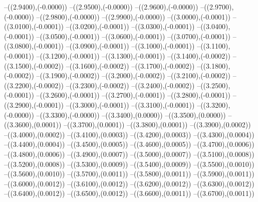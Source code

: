 {	--({\sx*(2.9400)},{\sy*(-0.0000)})
	--({\sx*(2.9500)},{\sy*(-0.0000)})
	--({\sx*(2.9600)},{\sy*(-0.0000)})
	--({\sx*(2.9700)},{\sy*(-0.0000)})
	--({\sx*(2.9800)},{\sy*(-0.0000)})
	--({\sx*(2.9900)},{\sy*(-0.0000)})
	--({\sx*(3.0000)},{\sy*(-0.0001)})
	--({\sx*(3.0100)},{\sy*(-0.0001)})
	--({\sx*(3.0200)},{\sy*(-0.0001)})
	--({\sx*(3.0300)},{\sy*(-0.0001)})
	--({\sx*(3.0400)},{\sy*(-0.0001)})
	--({\sx*(3.0500)},{\sy*(-0.0001)})
	--({\sx*(3.0600)},{\sy*(-0.0001)})
	--({\sx*(3.0700)},{\sy*(-0.0001)})
	--({\sx*(3.0800)},{\sy*(-0.0001)})
	--({\sx*(3.0900)},{\sy*(-0.0001)})
	--({\sx*(3.1000)},{\sy*(-0.0001)})
	--({\sx*(3.1100)},{\sy*(-0.0001)})
	--({\sx*(3.1200)},{\sy*(-0.0001)})
	--({\sx*(3.1300)},{\sy*(-0.0001)})
	--({\sx*(3.1400)},{\sy*(-0.0002)})
	--({\sx*(3.1500)},{\sy*(-0.0002)})
	--({\sx*(3.1600)},{\sy*(-0.0002)})
	--({\sx*(3.1700)},{\sy*(-0.0002)})
	--({\sx*(3.1800)},{\sy*(-0.0002)})
	--({\sx*(3.1900)},{\sy*(-0.0002)})
	--({\sx*(3.2000)},{\sy*(-0.0002)})
	--({\sx*(3.2100)},{\sy*(-0.0002)})
	--({\sx*(3.2200)},{\sy*(-0.0002)})
	--({\sx*(3.2300)},{\sy*(-0.0002)})
	--({\sx*(3.2400)},{\sy*(-0.0002)})
	--({\sx*(3.2500)},{\sy*(-0.0001)})
	--({\sx*(3.2600)},{\sy*(-0.0001)})
	--({\sx*(3.2700)},{\sy*(-0.0001)})
	--({\sx*(3.2800)},{\sy*(-0.0001)})
	--({\sx*(3.2900)},{\sy*(-0.0001)})
	--({\sx*(3.3000)},{\sy*(-0.0001)})
	--({\sx*(3.3100)},{\sy*(-0.0001)})
	--({\sx*(3.3200)},{\sy*(-0.0000)})
	--({\sx*(3.3300)},{\sy*(-0.0000)})
	--({\sx*(3.3400)},{\sy*(0.0000)})
	--({\sx*(3.3500)},{\sy*(0.0000)})
	--({\sx*(3.3600)},{\sy*(0.0001)})
	--({\sx*(3.3700)},{\sy*(0.0001)})
	--({\sx*(3.3800)},{\sy*(0.0001)})
	--({\sx*(3.3900)},{\sy*(0.0002)})
	--({\sx*(3.4000)},{\sy*(0.0002)})
	--({\sx*(3.4100)},{\sy*(0.0003)})
	--({\sx*(3.4200)},{\sy*(0.0003)})
	--({\sx*(3.4300)},{\sy*(0.0004)})
	--({\sx*(3.4400)},{\sy*(0.0004)})
	--({\sx*(3.4500)},{\sy*(0.0005)})
	--({\sx*(3.4600)},{\sy*(0.0005)})
	--({\sx*(3.4700)},{\sy*(0.0006)})
	--({\sx*(3.4800)},{\sy*(0.0006)})
	--({\sx*(3.4900)},{\sy*(0.0007)})
	--({\sx*(3.5000)},{\sy*(0.0007)})
	--({\sx*(3.5100)},{\sy*(0.0008)})
	--({\sx*(3.5200)},{\sy*(0.0008)})
	--({\sx*(3.5300)},{\sy*(0.0009)})
	--({\sx*(3.5400)},{\sy*(0.0009)})
	--({\sx*(3.5500)},{\sy*(0.0010)})
	--({\sx*(3.5600)},{\sy*(0.0010)})
	--({\sx*(3.5700)},{\sy*(0.0011)})
	--({\sx*(3.5800)},{\sy*(0.0011)})
	--({\sx*(3.5900)},{\sy*(0.0011)})
	--({\sx*(3.6000)},{\sy*(0.0012)})
	--({\sx*(3.6100)},{\sy*(0.0012)})
	--({\sx*(3.6200)},{\sy*(0.0012)})
	--({\sx*(3.6300)},{\sy*(0.0012)})
	--({\sx*(3.6400)},{\sy*(0.0012)})
	--({\sx*(3.6500)},{\sy*(0.0012)})
	--({\sx*(3.6600)},{\sy*(0.0011)})
	--({\sx*(3.6700)},{\sy*(0.0011)})
}
